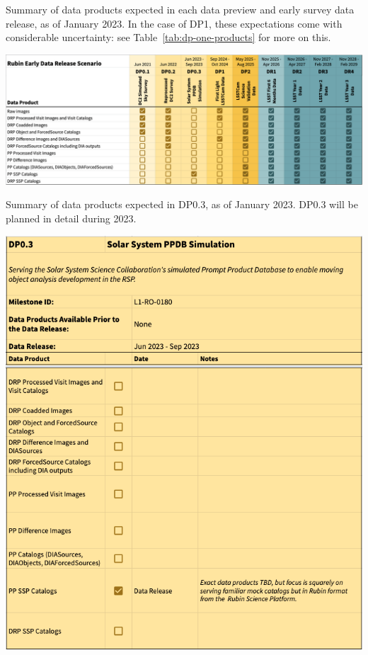 \begin{table}
\caption{Summary of data products expected in each data preview and early survey data release, as of January 2023.
In the case of DP1, these expectations come with considerable uncertainty: see Table~\ref{tab:dp-one-products} for more on this.}
\label{tab:summary}
\includegraphics[width=\linewidth]{figures/DPR-summary}
\end{table}

\begin{table}
\caption{Summary of data products expected in DP0.3, as of January 2023.
DP0.3 will be planned in detail during 2023.}
\label{tab:dp-zpthree-products}
\includegraphics[width=\linewidth]{figures/DP0_3-products}
\end{table}

